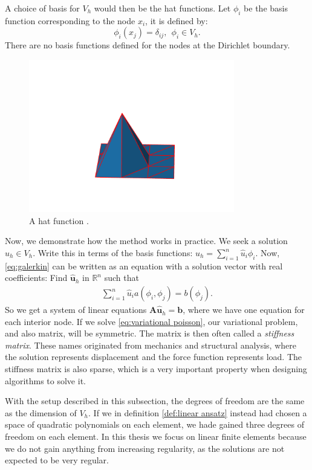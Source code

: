 \documentclass[../Main/main.tex]{subfiles}
\begin{document}
	A choice of basis for $V_h$ would then be the hat functions.  Let $\phi_i$ be the basis function corresponding to the node $x_i$, it is defined by:
	\begin{equation*}
		\phi_i(x_j) = \delta_{ij}, \ \ \phi_i \in V_h.
	\end{equation*}
	There are no basis functions defined for the nodes at the Dirichlet boundary.
	\begin{figure}[H]
		\centering
		\includegraphics[width=0.8\textwidth]{hat_function_python_plot_2.pdf}
		\caption{A hat function .}
		\label{fig:hat1}
	\end{figure}
	Now, we demonstrate how the method works in practice. We seek a solution $u_h \in V_h$. Write this in terms of the basis functions: $u_h = \sum_{i=1}^n \hat{u}_i \phi_i$. Now, \eqref{eq:galerkin} can be written as an equation with a solution vector with real coefficients: Find $\hat{\bm{u}}_h$ in $\mathbb{R}^n$ such that
	\begin{equation}\label{eq:fem system}
		\begin{gathered}
			\sum_{i=1}^n \hat{u}_i  a(\phi_i,\phi_j) = b(\phi_j).
		\end{gathered}
	\end{equation}
	So we get a system of linear equations $\bm{A}\hat{\bm{u}}_h = \bm{b}$, where we have one equation for each interior node. If we solve \eqref{eq:variational poisson}, our variational problem, and also matrix, will be symmetric. The matrix is then often called a \emph{stiffness matrix}. These names originated from mechanics and structural analysis, where the solution represents displacement and the force function represents load. The stiffness matrix is also sparse, which is a very important property when designing algorithms to solve it.\par
	With the setup described in this subsection, the degrees of freedom are the same as the dimension of $V_h$. If we in definition \ref{def:linear ansatz} instead had chosen a space of quadratic polynomials on each element, we hade gained three degrees of freedom on each element. In this thesis we focus on linear finite elements because we do not gain anything from increasing regularity, as the solutions are not expected to be very regular. 
\end{document}
